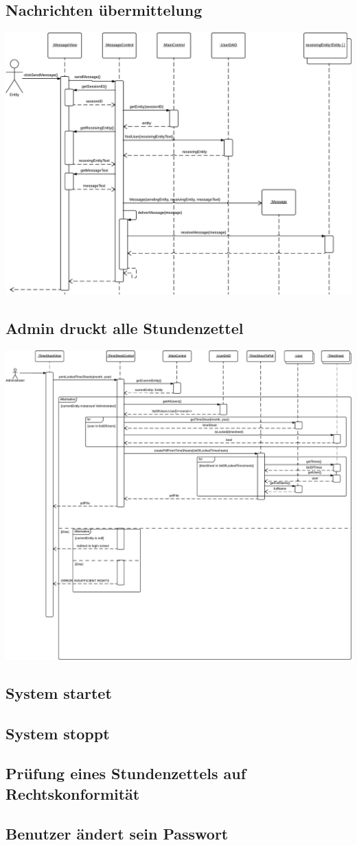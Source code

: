     \subsection{Nachrichten übermittelung}
        \includegraphics[width=\linewidth]{Diagramms/sequenzes/message_delivery.pdf}\\
    \subsection{Admin druckt alle Stundenzettel}
        \includegraphics[width=\linewidth]{Diagramms/sequenzes/admin_prints_timesheets.pdf}\\
    \subsection{System startet}
    \subsection{System stoppt}
    \subsection{Prüfung eines Stundenzettels auf Rechtskonformität}
    \subsection{Benutzer ändert sein Passwort}

\newpage
